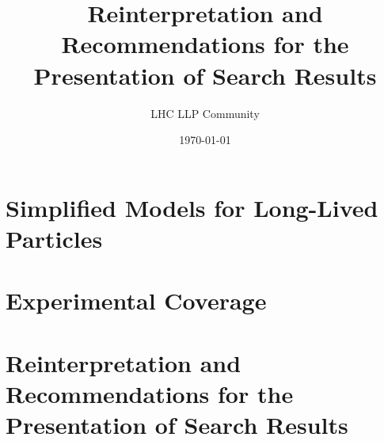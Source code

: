 \documentclass[a4paper,debug,notitlepage,nobib]{tufte-book}
\title{Reinterpretation and Recommendations for the Presentation of Search Results}
\author{LHC LLP Community}
\date{\today}
\begin{document}
\setcounter{secnumdepth}{3} %



\setcounter{tocdepth}{1}
\tableofcontents
 

\chapter{Simplified Models for Long-Lived Particles}


\chapter{Experimental Coverage}


\chapter{Reinterpretation and Recommendations for the Presentation of Search Results}





 


 
\printbibliography
\end{document}
